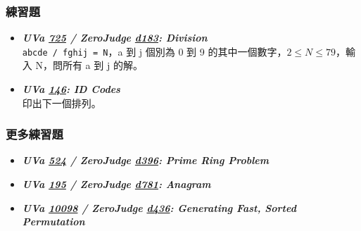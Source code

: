 \subsubsection*{練習題}
\begin{itemize}[label={\Checkmark}]
\item \textbf{\textit{UVa \href{http://uva.onlinejudge.org/external/7/725.html}{725} / ZeroJudge \href{http://zerojudge.tw/ShowProblem?problemid=d183}{d183}: Division}}\\
\texttt{abcde / fghij = N}，a 到 j 個別為 0 到 9 的其中一個數字，$2\leq{N}\leq{79}$，輸入 N，問所有 a 到 j 的解。
\item \textbf{\textit{UVa \href{http://uva.onlinejudge.org/external/1/146.html}{146}: ID Codes}}\\
印出下一個排列。
\end{itemize}
\subsubsection*{更多練習題}
\begin{itemize}[label={\PencilLeftDown}]
\item \textbf{\textit{UVa \href{http://uva.onlinejudge.org/external/5/524.html}{524} / ZeroJudge \href{http://zerojudge.tw/ShowProblem?problemid=d396}{d396}: Prime Ring Problem}}
\item \textbf{\textit{UVa \href{http://uva.onlinejudge.org/external/1/195.html}{195} / ZeroJudge \href{http://zerojudge.tw/ShowProblem?problemid=d781}{d781}: Anagram}}
\item \textbf{\textit{UVa \href{http://uva.onlinejudge.org/external/100/10098.html}{10098} / ZeroJudge \href{http://zerojudge.tw/ShowProblem?problemid=d436}{d436}: Generating Fast, Sorted Permutation}}
\end{itemize}